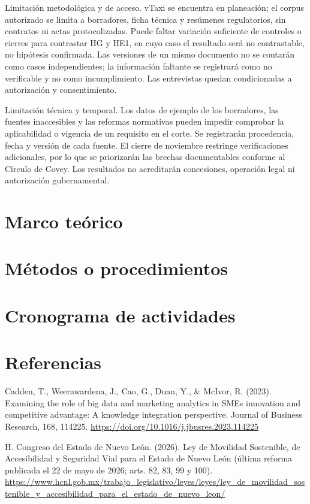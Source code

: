 {Limitación metodológica y de acceso. vTaxi se encuentra en planeación; el corpus autorizado se limita a borradores, ficha técnica y resúmenes regulatorios, sin contratos ni actas protocolizadas. Puede faltar variación suficiente de controles o cierres para contrastar HG y HE1, en cuyo caso el resultado será no contrastable, no hipótesis confirmada. Las versiones de un mismo documento no se contarán como casos independientes; la información faltante se registrará como no verificable y no como incumplimiento. Las entrevistas quedan condicionadas a autorización y consentimiento.


Limitación técnica y temporal. Los datos de ejemplo de los borradores, las fuentes inaccesibles y las reformas normativas pueden impedir comprobar la aplicabilidad o vigencia de un requisito en el corte. Se registrarán procedencia, fecha y versión de cada fuente. El cierre de noviembre restringe verificaciones adicionales, por lo que se priorizarán las brechas documentables conforme al Círculo de Covey. Los resultados no acreditarán concesiones, operación legal ni autorización gubernamental.


\section{Marco teórico}
\section{Métodos o procedimientos}
\section{Cronograma de actividades}
\clearpage\section*{Referencias}
Cadden, T., Weerawardena, J., Cao, G., Duan, Y., \& McIvor, R. (2023). Examining the role of big data and marketing analytics in SMEs innovation and competitive advantage: A knowledge integration perspective. Journal of Business Research, 168, 114225. \url{https://doi.org/10.1016/j.jbusres.2023.114225}


H. Congreso del Estado de Nuevo León. (2026). Ley de Movilidad Sostenible, de Accesibilidad y Seguridad Vial para el Estado de Nuevo León (última reforma publicada el 22 de mayo de 2026; arts. 82, 83, 99 y 100). \url{https://www.hcnl.gob.mx/trabajo_legislativo/leyes/leyes/ley_de_movilidad_sostenible_y_accesibilidad_para_el_estado_de_nuevo_leon/}


}
